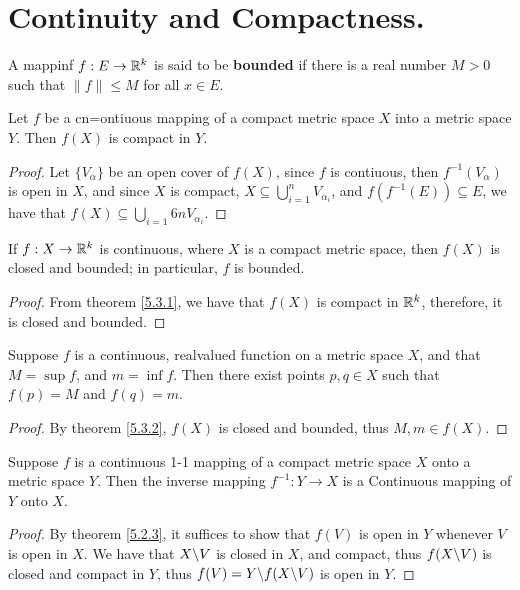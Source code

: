 
\section{Continuity and Compactness.}

\begin{definition}
    A mappinf $f:E \rightarrow \mathbb{R}^k$ is said to be \textbf{bounded} if there is a real number $M>0$
    such that  $\|f\| \leq M$ for all  $x \in E$.
\end{definition}

\begin{theorem}\label{5.3.1}
    Let $f$ be a cn=ontiuous mapping of a compact metric space  $X$ into a metric space
    $Y$. Then  $f(X)$ is compact in  $Y$.
\end{theorem}
\begin{proof}
    Let $\{V_{\alpha}\}$ be an open cover of  $f(X)$, since $f$ is contiuous, then  $f^{-1}(V_{\alpha})$
    is open in  $X$, and since  $X$ is compact,  $X \subseteq \bigcup_{i=1}^{n}{V_{\alpha_i}}$, and
    $f(f^{-1}(E)) \subseteq E$, we have that  $f(X) \subseteq \bigcup_{i=1}6{n}{V_{\alpha_i}}$.
\end{proof}

\begin{theorem}\label{5.3.2}
    If $f:X \rightarrow \mathbb{R}^k$ is continuous, where  $X$ is a compact metric space, then  $f(X)$
    is closed and bounded; in particular, $f$ is bounded.
\end{theorem}
\begin{proof}
    From theorem \ref{5.3.1}, we have that $f(X)$ is compact in  $\mathbb{R}^k$, therefore, it is
    closed and bounded.
\end{proof}

\begin{theorem}\label{5.3.3}
    Suppose $f$ is a continuous, realvalued function on a metric space $X$, and that
    $M=\sup{f}$, and  $m=\inf{f}$. Then there exist points  $p,q \in X$ such that  $f(p)=M$
    and  $f(q)=m$.
\end{theorem}
\begin{proof}
    By theorem \ref{5.3.2}, $f(X)$ is closed and bounded, thus  $M,m \in f(X)$.
\end{proof}

\begin{theorem}\label{5.3.4}
    Suppose $f$ is a continuous 1-1 mapping of a compact metric space  $X$ onto a metric
    space  $Y$. Then the inverse mapping  $f^{-1}:Y \rightarrow X$ is a Continuous mapping
    of  $Y$ onto  $X$.
\end{theorem}
\begin{proof}
    By theorem \ref{5.2.3}, it suffices to show that  $f(V)$ is open in  $Y$ whenever  $V$ is
    open in  $X$. We have that  $X \backslash V$ is closed in  $X$, and compact, thus  $f(X \backslash V)$
    is closed and compact in  $Y$, thus $ f(V)=Y \backslash f(X \backslash V)$ is open in $Y$.
\end{proof}

